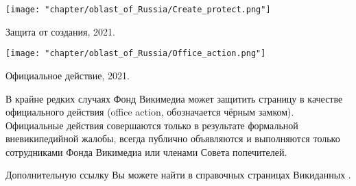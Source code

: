 \begin{marginfigure}[0.0cm]
{
	\setlength{\fboxsep}{0pt}%
	\setlength{\fboxrule}{1pt}%
	{\texttt{[image: "chapter/oblast\_of\_Russia/Create\_protect.png"]}}
}
\caption []{Защита от создания, 2021.}%
\label{fig:legend_population}%
\end{marginfigure}

\begin{marginfigure}[0.0cm]
{
	\setlength{\fboxsep}{0pt}%
	\setlength{\fboxrule}{1pt}%
	{\texttt{[image: "chapter/oblast\_of\_Russia/Office\_action.png"]}}
}
\caption []{Официальное действие, 2021.}%
\label{fig:legend_population}%
\end{marginfigure}

В крайне редких случаях Фонд Викимедиа может защитить страницу в качестве официального действия (office action, обозначается чёрным замком). Официальные действия совершаются только в результате формальной вневикипедийной жалобы, всегда публично объявляются и выполняются только сотрудниками Фонда Викимедиа или членами Совета попечителей.

Дополнительную ссылку Вы можете найти в справочных страницах Викиданных\protect\footnotemark
{}.
